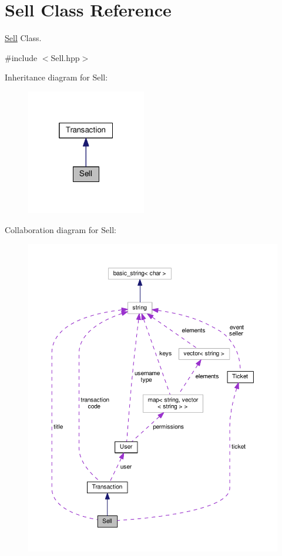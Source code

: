 \hypertarget{class_sell}{\section{Sell Class Reference}
\label{class_sell}
}


\hyperlink{class_sell}{Sell} Class.  




{\ttfamily \#include $<$Sell.\-hpp$>$}



Inheritance diagram for Sell\-:
\nopagebreak
\begin{figure}[H]
\begin{center}
\leavevmode
\includegraphics[width=148pt]{class_sell__inherit__graph}
\end{center}
\end{figure}


Collaboration diagram for Sell\-:
\nopagebreak
\begin{figure}[H]
\begin{center}
\leavevmode
\includegraphics[width=350pt]{class_sell__coll__graph}
\end{center}
\end{figure}
